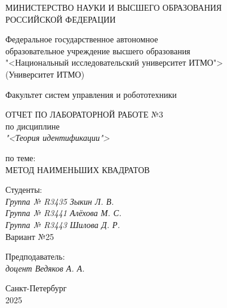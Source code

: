 \thispagestyle{empty}

\begin{center}
    МИНИСТЕРСТВО НАУКИ И ВЫСШЕГО ОБРАЗОВАНИЯ \\ РОССИЙСКОЙ ФЕДЕРАЦИИ

    \vspace{20pt}

    Федеральное государственное автономное \\ образовательное учреждение высшего образования \\
    "<Национальный исследовательский университет ИТМО"> \\
    (Университет ИТМО)

    \vspace{20pt}

    Факультет систем управления и робототехники
\end{center}

\vfill

\begin{center}
    ОТЧЕТ ПО ЛАБОРАТОРНОЙ РАБОТЕ №3\\  
    по дисциплине \\
    \textit{"<Теория идентификации">}

    \vspace{20pt}

    по теме: \\
    \uppercase{Метод наименьших квадратов}
\end{center}

\vfill

    \noindent Студенты: \\
    \textit{Группа № R3435 \hfill Зыкин Л. В.} \\
    \textit{Группа № R3441 \hfill Алёхова М. С.} \\
    \textit{Группа № R3443 \hfill Шилова Д. Р.} \\
    \noindent Вариант №25 \\
    \vspace{20pt}

    \noindent Предподаватель: \\
    \textit{доцент \hfill Ведяков А. А.}

\vfill

\begin{center}
    Санкт-Петербург \\ 2025
\end{center}